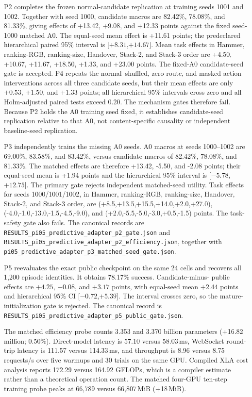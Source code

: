 P2 completes the frozen normal-candidate replication at training seeds 1001
and 1002.  Together with seed 1000, candidate macros are 82.42\%, 78.08\%,
and 81.33\%, giving effects of +13.42, +9.08, and +12.33 points against the
fixed seed-1000 matched A0.  The equal-seed mean effect is +11.61 points; the
predeclared hierarchical paired 95\% interval is [$+8.31$,$+14.67$].  Mean
task effects in Hammer, ranking-RGB, ranking-size, Handover, Stack-2, and
Stack-3 order are +4.50, +10.67, +11.67, +18.50, +1.33, and +23.00 points.
    The fixed-A0 candidate-seed gate is accepted.  P4 repeats the normal--shuffled, zero-route, and
masked-action interventions across all three candidate seeds, but their mean
effects are only $+0.53$, $+1.50$, and $+1.33$ points; all hierarchical 95\%
intervals cross zero and all Holm-adjusted paired tests exceed 0.20.  The
    mechanism gates therefore fail.  Because P2 holds the A0 training seed fixed,
    it establishes candidate-seed replication relative to that A0, not
    content-specific causality or independent baseline-seed replication.

P3 independently trains the missing A0 seeds.  A0 macros at seeds 1000--1002
are 69.00\%, 83.58\%, and 83.42\%, versus candidate macros of 82.42\%,
78.08\%, and 81.33\%.  The matched effects are therefore +13.42, -5.50, and
-2.08 points; their equal-seed mean is +1.94 points and the hierarchical 95\%
interval is [$-5.78$,$+12.75$].  The primary gate rejects independent
matched-seed utility.  Task effects for seeds 1000/1001/1002, in Hammer,
ranking-RGB, ranking-size, Handover, Stack-2, and Stack-3 order, are
(+8.5,+13.5,+15.5,+14.0,+2.0,+27.0),
(-4.0,-1.0,-13.0,-1.5,-4.5,-9.0), and
(+2.0,-5.5,-5.0,-3.0,+0.5,-1.5) points.  The task-safety gate also fails.
The canonical records are
\texttt{RESULTS\_pi05\_predictive\_adapter\_p2\_gate.json} and
\texttt{RESULTS\_pi05\_predictive\_adapter\_p2\_efficiency.json}, together
with \texttt{pi05\_predictive\_adapter\_p3\_matched\_seed\_gate.json}.

P5 reevaluates the exact public checkpoint on the same 24 cells and recovers
all 1,200 episode identities.  It obtains 78.17\% success.  Candidate-minus-
public effects are $+4.25$, $-0.08$, and $+3.17$ points, with equal-seed mean
$+2.44$ points and hierarchical 95\% CI [$-0.72$,$+5.39$].  The interval
crosses zero, so the mature-initialization gate is rejected.  The canonical
record is
\texttt{RESULTS\_pi05\_predictive\_adapter\_p5\_public\_gate.json}.

The matched efficiency probe counts 3.353 and 3.370 billion parameters
(+16.82 million; 0.50\%).  Direct-model latency is 57.10 versus 58.03\,ms,
WebSocket round-trip latency is 111.57 versus 114.33\,ms, and throughput is
8.96 versus 8.75 requests/s over five warmups and 30 trials on the same GPU.
Compiled XLA cost analysis reports 172.29 versus 164.92 GFLOPs, which is a
compiler estimate rather than a theoretical operation count.  The matched
four-GPU ten-step training probe peaks at 66,789 versus 66,807\,MiB (+18\,MiB).

